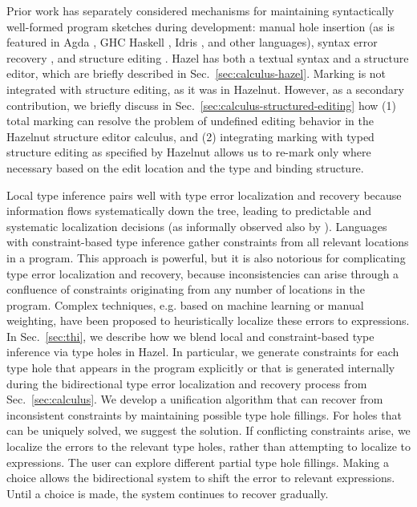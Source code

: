 Prior work has separately considered mechanisms for maintaining syntactically well-formed program sketches during development: manual hole insertion (as is featured in Agda \cite{agda}, GHC Haskell \cite{haskell-holes}, Idris \cite{idris-holes}, and other languages), syntax error recovery \cite{error-reovery}, and structure editing \cite{HazelnutPOPL}. 
Hazel has both a textual syntax and a structure editor, which are briefly described in Sec.~\ref{sec:calculus-hazel}. 
Marking is not integrated with structure editing, as it was in Hazelnut. 
However, as a secondary contribution, 
we briefly discuss in Sec.~\ref{sec:calculus-structured-editing} how (1)  total marking can resolve the problem of undefined editing behavior in the Hazelnut structure editor calculus, 
and (2) integrating marking with typed structure editing as specified by Hazelnut allows us to re-mark only where necessary based on the edit location and the type and binding structure.

Local type inference pairs well with type error localization and recovery because information flows systematically down the tree, leading to predictable and systematic localization decisions (as informally observed also by \cite{pierce}). Languages with constraint-based type inference gather constraints from all relevant locations in a program. This approach is powerful, but it is also notorious for complicating type error localization and recovery, because inconsistencies can arise through a confluence of constraints originating from any number of locations in the program. 
Complex techniques, e.g. based on machine learning or manual weighting, have been proposed to heuristically localize these errors to expressions. 
In Sec.~\ref{sec:thi}, we describe how we blend local and constraint-based type inference via type holes in Hazel. In particular,  
we generate constraints for each type hole that appears in the program explicitly or that is  generated internally during the  bidirectional type error localization and recovery process from Sec.~\ref{sec:calculus}. 
We develop a unification algorithm that can recover from inconsistent constraints by maintaining possible type hole fillings. For holes that can be uniquely solved, we suggest the solution. 
If conflicting constraints arise, we localize the errors to the relevant type holes, rather 
than attempting to localize to expressions. 
The user can explore different partial type hole fillings. Making a choice allows the bidirectional system to shift the error to relevant expressions.
Until a choice is made, the system continues to recover gradually.


